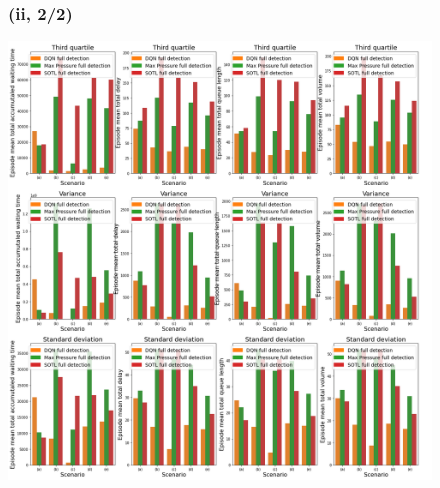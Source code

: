 \pagebreak

\begin{figure}[h]
\subsubsection*{(ii, 2/2)}
\includegraphics[width=\textwidth]{img/Appendix/2_2.png}
\centering
\end{figure}
\restoregeometry

\pagebreak

